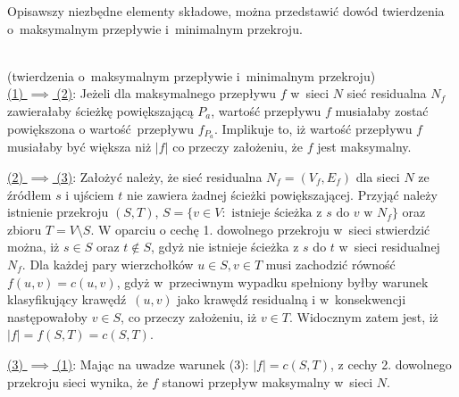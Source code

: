 \par{
  Opisawszy niezbędne elementy składowe, można przedstawić dowód twierdzenia o~maksymalnym przepływie i~minimalnym przekroju.
\\
\\
  \begin{bproof}{(twierdzenia o~maksymalnym przepływie i~minimalnym przekroju)\\}
    \underline{(1) $\implies$ (2)}: Jeżeli dla maksymalnego przepływu $f$ w~sieci $N$ sieć residualna $N_f$ zawierałaby ścieżkę powiększającą $P_a$, wartość przepływu $f$ musiałaby zostać powiększona o wartość przepływu $f_{P_a}$.
    Implikuje to, iż wartość przepływu $f$ musiałaby być większa niż $|f|$ co przeczy założeniu, że $f$ jest maksymalny.

    \underline{(2) $\implies$ (3)}: Założyć należy, że sieć residualna $N_f=(V_f, E_f)$ dla sieci $N$ ze źródłem $s$ i ujściem $t$ nie zawiera żadnej ścieżki powiększającej.
    Przyjąć należy istnienie przekroju $(S, T)$, $S=\{v \in V:\text{ istnieje ścieżka z }s\text{ do }v\text{ w~}N_f\}$ oraz zbioru $T=V\setminus S$.
    W oparciu o cechę 1. dowolnego przekroju w~sieci stwierdzić można, iż $s \in S$ oraz $t \notin S$, gdyż nie istnieje ścieżka z $s$ do $t$ w~sieci residualnej $N_f$.
    Dla każdej pary wierzchołków $u \in S, v \in T$ musi zachodzić równość $f(u, v)=c(u, v)$, gdyż w~przeciwnym wypadku spełniony byłby warunek klasyfikujący krawędź $(u,v)$ jako krawędź residualną i w~konsekwencji następowałoby $v \in S$, co przeczy założeniu, iż $v \in T$.
    Widocznym zatem jest, iż $|f|=f(S, T)=c(S, T)$.

    \underline{(3) $\implies$ (1)}: Mając na uwadze warunek (3): $|f|=c(S,T)$, z cechy 2. dowolnego przekroju sieci wynika, że $f$ stanowi przepływ maksymalny w~sieci $N$.
  \end{bproof}
}
